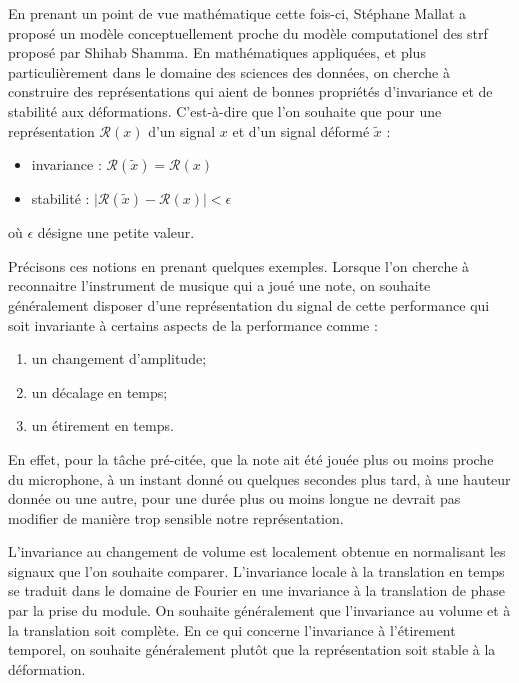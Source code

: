 En prenant un point de vue mathématique cette fois-ci, Stéphane Mallat a proposé un modèle conceptuellement proche du modèle computationel des strf proposé par Shihab Shamma. En mathématiques appliquées, et plus particulièrement dans le domaine des sciences des données, on cherche à construire des représentations qui aient de bonnes propriétés d'invariance et de stabilité aux déformations. C'est-à-dire que l'on souhaite que pour une représentation $\mathcal{R}(x)$ d'un signal $x$ et d'un signal déformé $\tilde x$ :
\begin{itemize}
  \item invariance : $\mathcal{R}(\tilde x) = \mathcal{R}(x)$
  \item stabilité : $ \vert \mathcal{R}(\tilde x) - \mathcal{R}(x) | < \epsilon $
\end{itemize}
où $\epsilon$ désigne une petite valeur.

Précisons ces notions en prenant quelques exemples. Lorsque l'on cherche à reconnaitre l'instrument de musique qui a joué une note, on souhaite généralement disposer d'une représentation du signal de cette performance qui soit invariante à certains aspects de la performance comme :
\begin{enumerate}
  \item un changement d'amplitude;
  \item un décalage en temps;
  \item un étirement en temps.
\end{enumerate}
En effet, pour la tâche pré-citée, que la note ait été jouée plus ou moins proche du microphone, à un instant donné ou quelques secondes plus tard, à une hauteur donnée ou une autre, pour une durée plus ou moins longue ne devrait pas modifier de manière trop sensible notre représentation.

L'invariance au changement de volume est localement obtenue en normalisant les signaux que l'on souhaite comparer. L'invariance locale à la translation en temps se traduit dans le domaine de Fourier en une invariance à la translation de phase par la prise du module. On souhaite généralement que l'invariance au volume et à la translation soit complète. En ce qui concerne l'invariance à l'étirement temporel, on souhaite généralement plutôt que la représentation soit stable à la déformation.

